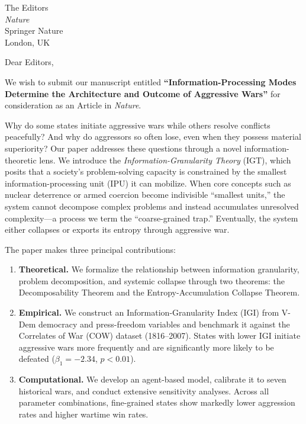 \documentclass[11pt]{letter}
\begin{document}
\begin{letter}{
    The Editors\\
    \textit{Nature}\\
    Springer Nature\\
    London, UK
}

\opening{Dear Editors,}

We wish to submit our manuscript entitled \textbf{``Information-Processing Modes Determine the Architecture and Outcome of Aggressive Wars''} for consideration as an Article in \textit{Nature}.

Why do some states initiate aggressive wars while others resolve conflicts peacefully? And why do aggressors so often lose, even when they possess material superiority? Our paper addresses these questions through a novel information-theoretic lens. We introduce the \textit{Information-Granularity Theory} (IGT), which posits that a society's problem-solving capacity is constrained by the smallest information-processing unit (IPU) it can mobilize. When core concepts such as nuclear deterrence or armed coercion become indivisible ``smallest units,'' the system cannot decompose complex problems and instead accumulates unresolved complexity---a process we term the ``coarse-grained trap.'' Eventually, the system either collapses or exports its entropy through aggressive war.

The paper makes three principal contributions:

\begin{enumerate}
    \item \textbf{Theoretical.} We formalize the relationship between information granularity, problem decomposition, and systemic collapse through two theorems: the Decomposability Theorem and the Entropy-Accumulation Collapse Theorem.
    \item \textbf{Empirical.} We construct an Information-Granularity Index (IGI) from V-Dem democracy and press-freedom variables and benchmark it against the Correlates of War (COW) dataset (1816--2007). States with lower IGI initiate aggressive wars more frequently and are significantly more likely to be defeated ($\beta_1=-2.34$, $p<0.01$).
    \item \textbf{Computational.} We develop an agent-based model, calibrate it to seven historical wars, and conduct extensive sensitivity analyses. Across all parameter combinations, fine-grained states show markedly lower aggression rates and higher wartime win rates.
\end{enumerate}


\end{letter}
\end{document}
